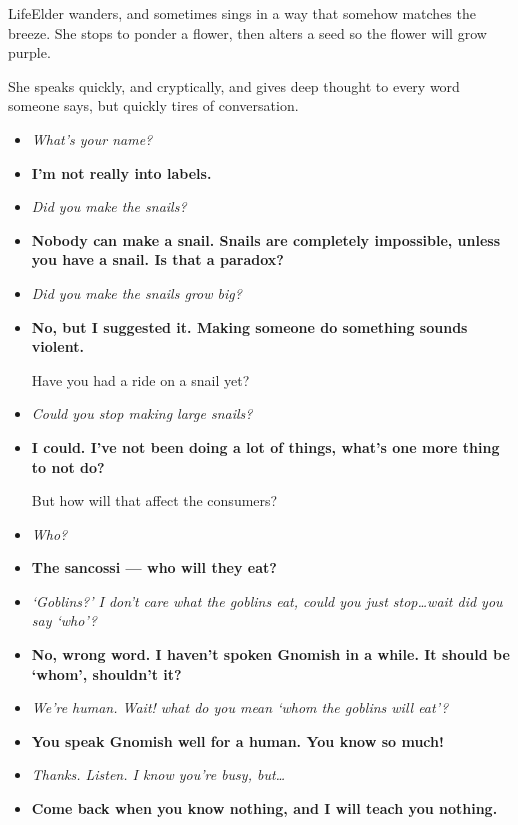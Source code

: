 \begin{multicols}{2}
\Gls{LifeElder} wanders, and sometimes sings in a way that somehow matches the breeze.
She stops to ponder a flower, then alters a seed so the flower will grow purple.

She speaks quickly, and cryptically, and gives deep thought to every word someone says, but quickly tires of conversation.

\begin{itemize}
  \item\it
  What's your name?
  \item[\adforn{54}]\bf
  I'm not really into labels.
  \item\it
  Did you make the snails?
  \item[\adforn{54}]\bf
  Nobody can make a snail.
  Snails are completely impossible, unless you have a snail.
  Is that a paradox?
  \item\it
  Did you make the snails grow big?
  \item[\adforn{54}]\bf
  No, but I suggested it.
  Making someone do something sounds violent.

  Have you had a ride on a snail yet?
  \item\it
  Could you stop making large snails?
  \item[\adforn{54}]\bf
  I could.
  I've not been doing a lot of things, what's one more thing to not do?

  But how will that affect the \glspl{consumer}?
  \item\it
  Who?
  \item[\adforn{54}]\bf
  The sancossi --- who will they eat?
  \item\it
  `Goblins?'
  I don't care what the goblins eat, could you just stop\ldots wait did you say `who'?
  \item[\adforn{54}]\bf
  No, wrong word.
  I haven't spoken Gnomish in a while.
  It should be `whom', shouldn't it?
  \item\it
  We're human.
  Wait! what do you mean `whom the goblins will eat'?
  \item[\adforn{54}]\bf
  You speak Gnomish well for a human.
  You know so much!
  \item\it
  Thanks.
  Listen.
  I know you're busy, but\ldots
  \item[\adforn{54}]\bf
  Come back when you know nothing, and I will teach you nothing.
\end{itemize}

\LifeElder

\showStdSpells


\end{multicols}

